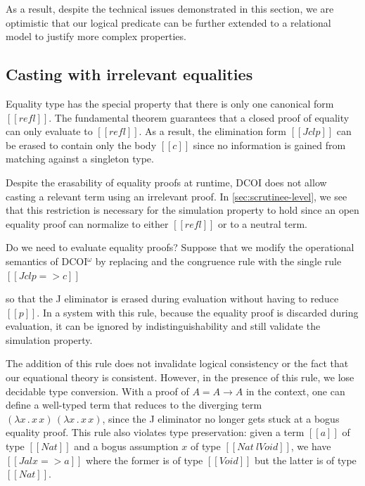 \documentclass[acmsmall, screen=true, nonacm=true,
  review=\ifpublic false\else true\fi,
  anonymous=\ifanonymous true\else false\fi
]{acmart}
\makeatletter
\newcommand{\sw}[1]{}
\newcommand{\dcoi}{DCOI\@\xspace}
\newcommand{\name}{\texorpdfstring{DCOI$^{\omega}$\@\xspace}{DCOI-omega}}
\makeatother
\begin{document}
As a result, despite the technical issues demonstrated in this section,
we are optimistic that our logical predicate can be further extended to
a relational model to justify more complex properties. 


\subsection{Casting with irrelevant equalities}
\label{sec:castirrel}

Equality type has the special property that
there is only one canonical form $[[refl]]$.
The fundamental theorem guarantees that a closed proof of equality can only evaluate to
$[[refl]]$. As a result, the elimination form $[[J c l p]]$ can be
erased to contain only the body $[[c]]$
since no information is gained from
matching against a singleton type.

Despite the erasability of equality proofs at runtime,
\dcoi does not allow casting a relevant term using an irrelevant proof.
In \cref{sec:scrutinee-level}, we see that this restriction is
necessary for the simulation property to hold since an open equality
proof can normalize to either $[[refl]]$ or to a neutral term.

Do we need to evaluate equality proofs? Suppose that we 
modify the operational semantics of \name
by replacing  and the congruence rule with the single rule $[[J c l p => c]]$ %
\sw{Maybe we should write this rule as a rule and give it name, if we have space.}
so that the J eliminator is erased during evaluation without having
to reduce $[[p]]$.
In a system with this rule, because the equality proof is discarded during evaluation, it can be ignored by
indistinguishability and still validate the simulation property.

The addition of this rule does not invalidate logical consistency or the fact that 
our equational theory is consistent. However, in the presence of this rule, 
we lose decidable type conversion.
With a proof of $A = A \rightarrow A$ in the context,
one can define a well-typed term that reduces to the diverging
term $(\lambda x \mathpunct{.} x \, x) \, (\lambda x \mathpunct{.} x \, x)$,
since the J eliminator no longer gets stuck at a bogus equality proof.
This rule also violates type preservation: given a term $[[a]]$ of type
$[[Nat]]$ and a bogus assumption $x$ of type $[[Nat ~ l Void]]$, we
have $[[J a l x => a]]$ where the former is of type $[[Void]]$ but the
latter is of type $[[Nat]]$.
\end{document}
